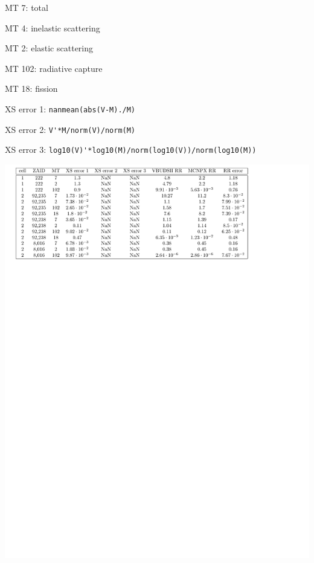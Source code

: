 \documentclass[letterpaper,12pt]{article}
\begin{document}
MT 7: total 

MT 4: inelastic scattering 

MT 2: elastic scattering 

MT 102: radiative capture 

MT 18: fission

XS error 1: \verb|nanmean(abs(V-M)./M)|

XS error 2: \verb|V'*M/norm(V)/norm(M)|

XS error 3: \verb|log10(V)'*log10(M)/norm(log10(V))/norm(log10(M))|

\includegraphics{sandboxerrortable.pdf}
\end{document}
